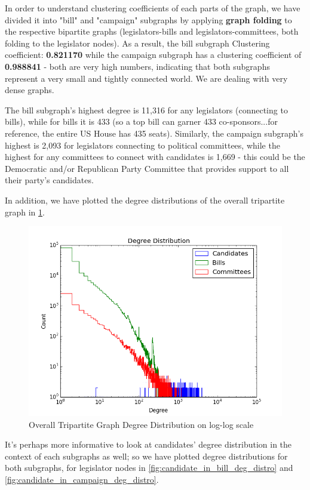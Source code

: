 \documentclass[12pt,twocolumn]{article}
\begin{document}
In order to understand clustering coefficients of each parts of the graph, we have divided it into "bill" and "campaign" subgraphs by applying \textbf{graph folding} to the respective bipartite graphs (legislators-bills and legislators-committees, both folding to the legislator nodes). As a result, the bill subgraph Clustering coefficient: \textbf{0.821170} while the campaign subgraph has a clustering coefficient of \textbf{0.988841} - both are very high numbers, indicating that both subgraphs represent a very small and tightly connected world. We are dealing with very dense graphs. 

The bill subgraph's highest degree is 11,316 for any legislators (connecting to bills), while for bills it is 433 (so a top bill can garner 433 co-sponsors...for reference, the entire US House has 435 seats). Similarly, the campaign subgraph's highest is 2,093 for legislators connecting to political committees, while the highest for any committees to connect with candidates is 1,669 - this could be the Democratic and/or Republican Party Committee that provides support to all their party's candidates. 

In addition, we have plotted the degree distributions of the overall tripartite graph in \ref{fig:overalldegdistro}. 
\begin{figure}
\centering
\includegraphics[width=0.5\linewidth]{overall_deg_distro}
\caption{Overall Tripartite Graph Degree Distribution on log-log scale}
\label{fig:overalldegdistro}
\end{figure}

It's perhaps more informative to look at candidates' degree distribution in the context of each subgraphs as well; so we have plotted degree distributions for both subgraphs, for legislator nodes in \ref{fig:candidate_in_bill_deg_distro} and \ref{fig:candidate_in_campaign_deg_distro}. 
\end{document}
